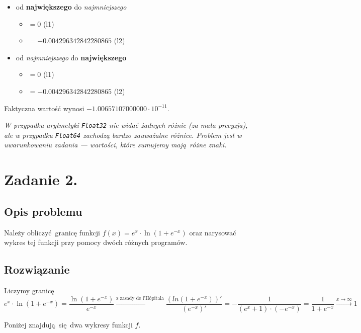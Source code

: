 \documentclass[10pt]{article}
\begin{document}
\begin{itemize}
\begin{itemize}
\begin{itemize}
        \end{itemize}
        \item od \textbf{największego} do \textit{najmniejszego}
        \begin{itemize}
            \item $= 0$ (l1)
            \item $= -0.004296342842280865$ (l2)
        \end{itemize}
        \item od \textit{najmniejszego} do \textbf{największego}
        \begin{itemize}
            \item $= 0$ (l1)
            \item $= -0.004296342842280865$ (l2)
        \end{itemize}
    \end{itemize}
\end{itemize}

Faktyczna wartość wynosi $-1.00657107000000 \cdot 10^{-11}$.

\textit{W przypadku arytmetyki \texttt{Float32} nie widać żadnych różnic (za mała precyzja), ale w przypadku \texttt{Float64} zachodzą bardzo zauważalne różnice. Problem jest w uwarunkowaniu zadania — wartości, które sumujemy mają różne znaki.}

\section{Zadanie 2.}

\subsection{Opis problemu}

Należy obliczyć granicę funkcji $f(x) = e^x \cdot \ln(1 + e^{-x})$ oraz narysować wykres tej funkcji przy pomocy dwóch różnych programów.

\subsection{Rozwiązanie}

Liczymy granicę
$$
e^x \cdot \ln(1 + e^{-x}) = \frac{\ln(1 + e^{-x})}{e^{-x}} \xrightarrow{\text{z zasady de l’Hôpitala}}
\frac{(ln(1 + e^{-x}))'}{(e^{-x})'} =
-\frac{1}{(e^x + 1) \cdot (-e^{-x})} =
\frac{1}{1 + e^{-x}} \xrightarrow[]{x \to \infty} 1
$$

\noindent Poniżej znajdują się dwa wykresy funkcji $f$.
\end{document}
